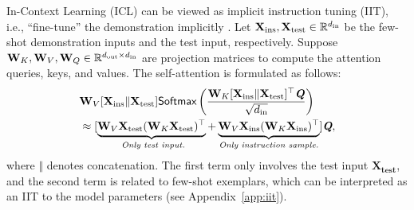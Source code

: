 In-Context Learning (ICL) can be viewed as implicit instruction tuning (IIT), i.e., “fine-tune” the demonstration implicitly \citep{1-shot2023li}.
Let $\mathbf{X_{\text{ins}}}, \mathbf{X_{\text{test}}} \in \mathbb{R}^{d_\text{in}}$ be the few-shot demonstration inputs and the test input, respectively. 
Suppose $\mathbf{W}_K, \mathbf{W}_V, \mathbf{W}_Q \in \mathbb{R}^{d_\text{out} \times d_\text{in}}$ are projection matrices to compute the attention queries, keys, and values. 
The self-attention is formulated as follows:
{\small
\begin{align*}
    & \mathbf{W}_V [\mathbf{X}_{\text{ins}} \Vert \mathbf{X}_{\text{test}} ]  \textsf{Softmax} \left(\frac{\mathbf{W}_K [\mathbf{X}_{\text{ins}} \Vert \mathbf{X}_{\text{test}} ] ^\top \textit{\textbf{Q}}} {\sqrt{ d_\text{in} }}\right)\\
    &\approx [\underbrace{\mathbf{W}_V\mathbf{X}_{\text{test}}(\mathbf{W}_K\mathbf{X}_{\text{test}})^\top}_{\textit{ Only test input.}}  + \underbrace{\mathbf{W}_V\mathbf{X}_{\text{ins}}(\mathbf{W}_K\mathbf{X}_{\text{ins}})^\top}_{\textit{Only instruction sample.}}] \textit{\textbf{Q}},
\end{align*}
}where $\Vert$ denotes concatenation.
The first term only involves the test input $\mathbf{X_{\text{test}}}$, and the second term is related to few-shot exemplars, which can be interpreted as an IIT to the model parameters \citep{dai2022iit1, yang2023iit2} (see Appendix~\ref{app:iit}).
